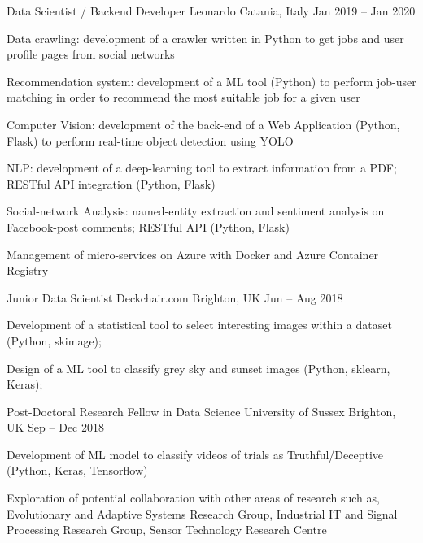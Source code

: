 \begin{cventries}
    \cventry
    {Data Scientist / Backend Developer}
    {Leonardo}    
    {Catania, Italy}
    {Jan 2019 -- Jan 2020}
    {
      \begin{cvitems}
        \item {Data crawling: development of a crawler written in Python to get jobs and user profile pages from social networks}
        \item {Recommendation system: development of a ML tool (Python) to perform job-user matching in order to recommend the most suitable job for a given user}
        \item {Computer Vision: development of the back-end of a Web Application (Python, Flask) to perform real-time object detection using YOLO}
        \item {NLP: development of a deep-learning tool to extract information from a PDF; RESTful API integration (Python, Flask)}
        \item {Social-network Analysis: named-entity extraction and sentiment analysis on Facebook-post comments; RESTful API (Python, Flask)}
        \item {Management of micro-services on Azure with Docker and Azure Container Registry}
      \end{cvitems}
    }

    \cventry
    {Junior Data Scientist}
    {Deckchair.com}
    {Brighton, UK}
    {Jun -- Aug 2018}
    {
      \begin{cvitems}
        \item Development of a statistical tool to select interesting images within a dataset (Python, skimage);
        \item Design of a ML tool to classify grey sky and sunset images (Python, sklearn, Keras);
      \end{cvitems}
    }
  \end{cventries}

\newpage

  \begin{cventries}
    \cventry
    {Post-Doctoral Research Fellow in Data Science}
    {University of Sussex}
    {Brighton, UK}
    {Sep -- Dec 2018}
    {
      \begin{cvitems}
        \item Development of ML model to classify videos of trials as Truthful/Deceptive (Python, Keras, Tensorflow)
        \item Exploration of potential collaboration with other areas of research such as, Evolutionary and Adaptive Systems Research Group, Industrial IT and Signal Processing Research Group, Sensor Technology Research Centre
      \end{cvitems}
    }
  \end{cventries}

